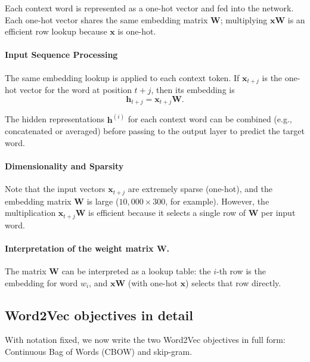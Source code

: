 Each context word is represented as a one-hot vector and fed into the network. Each one-hot vector shares the same embedding matrix \(\mathbf{W}\); multiplying \(\mathbf{x}\mathbf{W}\) is an efficient row lookup because \(\mathbf{x}\) is one-hot.

\paragraph{Input Sequence Processing}

The same embedding lookup is applied to each context token. If \(\mathbf{x}_{t+j}\) is the one-hot vector for the word at position \(t+j\), then its embedding is
\[
\mathbf{h}_{t+j} = \mathbf{x}_{t+j}\mathbf{W}.
\]

The hidden representations \(\mathbf{h}^{(i)}\) for each context word can be combined (e.g., concatenated or averaged) before passing to the output layer to predict the target word.

\paragraph{Dimensionality and Sparsity}

Note that the input vectors \(\mathbf{x}_{t+j}\) are extremely sparse (one-hot), and the embedding matrix \(\mathbf{W}\) is large (\(10{,}000 \times 300\), for example). However, the multiplication \(\mathbf{x}_{t+j}\mathbf{W}\) is efficient because it selects a single row of \(\mathbf{W}\) per input word.

\paragraph{Interpretation of the weight matrix \texorpdfstring{\(\mathbf{W}\)}{W}.}
\label{sec:nlp_interpretation_of_the_weight_matrix_w_w}

The matrix \(\mathbf{W}\) can be interpreted as a lookup table: the \(i\)-th row is the embedding for word \(w_i\), and \(\mathbf{x}\mathbf{W}\) (with one-hot \(\mathbf{x}\)) selects that row directly.


\subsection{Word2Vec objectives in detail}
\label{sec:nlp_word_embeddings_continuous_bag_of_words_cbow_and_skip_gram_models}

With notation fixed, we now write the two Word2Vec objectives in full form: Continuous Bag of Words (CBOW) and skip-gram.

